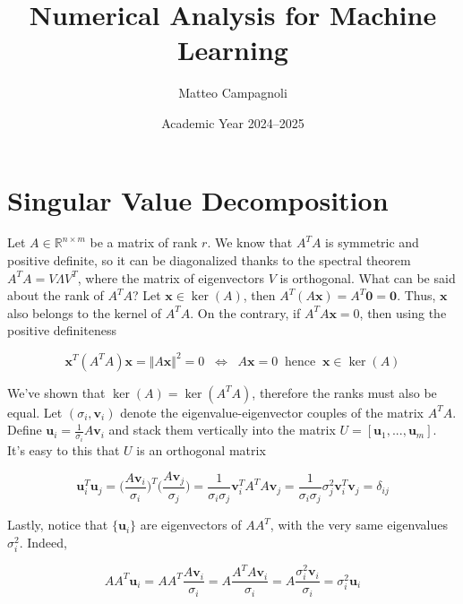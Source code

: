 \documentclass{article}
\title{Numerical Analysis for Machine Learning}
\author{Matteo Campagnoli}
\date{Academic Year 2024--2025}
\numberwithin{equation}{subsection}
\begin{document}
\maketitle
\tableofcontents

\newpage

\section{Singular Value Decomposition}
Let $A \in \mathbb{R}^{n \times m}$ be a matrix of rank $r$. We know that $A^TA$ is symmetric and positive definite, so it can be diagonalized thanks to the spectral theorem $A^T A = V \Lambda V^T$, where the matrix of eigenvectors $V$ is orthogonal. What can be said about the rank of $A^T A$? Let $\textbf{x} \in \ker(A)$, then $A^T (A\textbf{x}) = A^T \textbf{0} = \textbf{0}$. Thus, $\textbf{x}$ also belongs to the kernel of $A^TA$. On the contrary, if $A^T A \textbf{x} = 0$, then using the positive definiteness

\begin{equation*}
    \textbf{x}^T (A^T A) \textbf{x} = \Vert A \textbf{x} \Vert^2 = 0 \;\; \iff \;\; A\textbf{x} = 0 \;\; \text{hence} \;\; \textbf{x} \in \ker(A) 
\end{equation*}

We've shown that $\ker(A) = \ker(A^TA)$, therefore the ranks must also be equal. Let $(\sigma_i,\textbf{v}_i)$ denote the eigenvalue-eigenvector couples of the matrix $A^T A$. Define $\textbf{u}_i = \frac{1}{\sigma_i}A\textbf{v}_i$ and stack them vertically into the matrix $U = [\textbf{u}_1,...,\textbf{u}_m]$. It's easy to this that $U$ is an orthogonal matrix

\begin{equation*}
    \textbf{u}_i^T \textbf{u}_j = \Big(\frac{A\textbf{v}_i}{\sigma_i}\Big)^T \Big( \frac{A\textbf{v}_j}{\sigma_j}\Big) = \frac{1}{\sigma_i \sigma_j} \textbf{v}_i^T A^TA \textbf{v}_j = \frac{1}{\sigma_i \sigma_j} \sigma_j^2 \textbf{v}_i^T \textbf{v}_j = \delta_{ij}
\end{equation*}

Lastly, notice that $\{ \textbf{u}_i \}$ are eigenvectors of $A A^T$, with the very same eigenvalues $\sigma_i^2$. Indeed, 

\begin{equation*}
    A A^T \textbf{u}_i = A A^T \frac{A \textbf{v}_i}{\sigma_i} = A \frac{A^TA \textbf{v}_i}{\sigma_i} = A \frac{\sigma^2_i \textbf{v}_i}{\sigma_i} = \sigma_i^2 \textbf{u}_i
\end{equation*}
\end{document}
